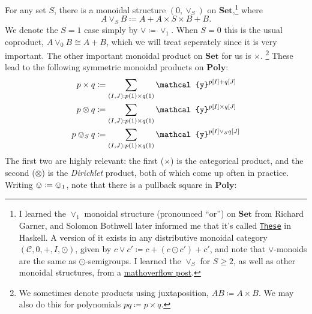 \documentclass[11pt, one side, article]{memoir}
\theoremstyle{definition}
\theoremstyle{plain}
\newcommand{\cat}[1]{\mathcal{#1}}%
\newcommand{\Cat}[1]{\mathbf{#1}}%
\newcommand{\tn}[1]{\textnormal{#1}}
\newcommand{\smset}{\Cat{Set}}
\newcommand{\yon}{{\mathcal{y}}}
\newcommand{\poly}{\Cat{Poly}}
\newcommand{\0}{\textsf{0}}
\newcommand{\1}{\tn{\textsf{1}}}
\newcommand{\othis}[1]{\tikz[baseline=(char.base)]{
            \node[shape=circle,draw,inner sep=1pt] (char) {\tiny #1};}}
\newcommand{\bang}{\,\mathbin{!}\,}
\newcommand{\obang}{\mathbin{\othis{!}}}
\begin{document}
For any set $S$, there is a monoidal structure $(0,\vee_S)$ on $\smset$,\footnote{I learned the $\vee_1$ monoidal structure (pronounced ``or'') on $\smset$ from Richard Garner, and Solomon Bothwell later informed me that it's called \href{https://hackage.haskell.org/package/these}{\texttt{These}} in Haskell. A version of it exists in any distributive monoidal category $(\cat{C},0,+,I,\odot)$, given by $c\vee c'\coloneqq c+(c\odot c')+c'$, and note that $\vee$-monoids are the same as $\odot$-semigroups. I learned the $\vee_S$ for $S\geq 2$, as well as other monoidal structures, from a \href{https://mathoverflow.net/questions/155939/what-other-monoidal-structures-exist-on-the-category-of-sets}{mathoverflow post}.}
 where
\begin{equation}
	A\vee_SB\coloneqq A+A\times S\times B + B.
\end{equation}
We denote the $S=1$ case simply by $\vee\coloneqq\vee_1$. When $S=0$ this is the usual coproduct, $A\vee_0B\cong A+B$, which we will treat seperately since it is very important. The other important monoidal product on $\smset$ for us is $\times$.%
\footnote{
	We sometimes denote products using juxtaposition, $AB\coloneqq A\times B$. We may also do this for polynomials $pq\coloneqq p\times q$.
}
These lead to the following symmetric monoidal products on $\poly$:
\begin{align}
\label{eqn.times}
	p\times q&\coloneqq\sum_{(I,J): p(1)\times q(1)}\yon^{p[I]+ q[J]}\\
\label{eqn.otimes}
	p\otimes q&\coloneqq\sum_{(I,J): p(1)\times q(1)}\yon^{p[I]\times q[J]}\\
\label{eqn.ovee}
	p\ovee_S q&\coloneqq\sum_{(I,J): p(1)\times q(1)}\yon^{p[I]\vee_S q[J]}
\end{align}
The first two are highly relevant: the first ($\times$) is the categorical product, and the second ($\otimes$) is the \emph{Dirichlet} product, both of which come up often in practice. Writing $\ovee\coloneqq\ovee_1$, note that there is a pullback square in $\poly$:
\end{document}
